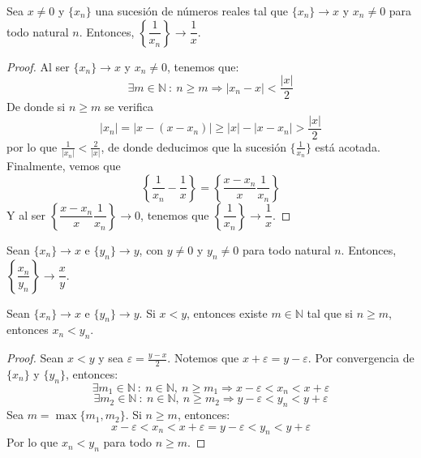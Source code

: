 \begin{prop}
    Sea $x \neq 0$ y $\{x_n\}$ una sucesión de números reales tal que $\{x_n\} \longrightarrow x$ y $x_n \neq 0$ para todo natural $n$. Entonces, $\left\{\dfrac{1}{x_n}\right\} \longrightarrow \dfrac{1}{x}$.
\end{prop}
\begin{proof}
    Al ser $\{x_n\} \longrightarrow x$ y $x_n \neq 0$, tenemos que:
    \begin{equation*}
        \exists m \in \mathbb{N} ~:~ n \geq m \Longrightarrow |x_n-x| < \frac{|x|}{2}
    \end{equation*}
    De donde si $n \geq m$ se verifica
    \begin{equation*}
        |x_n| = |x-(x-x_n)| \geq |x| - |x - x_n| > \frac{|x|}{2}
    \end{equation*}
    por lo que $\frac{1}{|x_n|} < \frac{2}{|x|}$, de donde deducimos que la sucesión $\{\frac{1}{x_n}\}$ está acotada.
    Finalmente, vemos que
    \begin{equation*}
        \left\{\frac{1}{x_n} - \frac{1}{x}\right\}=\left\{\frac{x-x_n}{x} \frac{1}{x_n}\right\}
    \end{equation*}
    Y al ser $\left\{\dfrac{x-x_n}{x} \dfrac{1}{x_n}\right\} \longrightarrow 0$, tenemos que $\left\{\dfrac{1}{x_n}\right\} \longrightarrow \dfrac{1}{x}$.
\end{proof}

\begin{coro}
    Sean $\{x_n\} \longrightarrow x$ e $\{y_n\} \longrightarrow y$, con $y \neq 0$ y $y_n \neq 0$ para todo natural $n$. Entonces, $\left\{\dfrac{x_n}{y_n}\right\} \longrightarrow \dfrac{x}{y}$.
\end{coro}

\begin{prop}
    Sean $\{x_n\} \longrightarrow x$ e $\{y_n\} \longrightarrow y$. Si $x < y$, entonces existe $m \in \mathbb{N}$ tal que si $n \geq m$, entonces $x_n < y_n$.
\end{prop}
\begin{proof}
    Sean $x < y$ y sea $\varepsilon = \frac{y-x}{2}$. Notemos que $x+\varepsilon = y-\varepsilon$.
    Por convergencia de $\{x_n\}$ y $\{y_n\}$, entonces:
    \begin{equation*}
        \exists m_1 \in \mathbb{N} ~:~ n \in \mathbb{N}, ~n \geq m_1 \Longrightarrow x-\varepsilon < x_n < x+\varepsilon
    \end{equation*}
    \begin{equation*}
        \exists m_2 \in \mathbb{N} ~:~ n \in \mathbb{N}, ~n \geq m_2 \Longrightarrow y-\varepsilon < y_n < y+\varepsilon
    \end{equation*}
    Sea $m = \max \{m_1, m_2\}$. Si $n \geq m$, entonces:
    \begin{equation*}
        x-\varepsilon < x_n < x+\varepsilon = y-\varepsilon < y_n < y+\varepsilon
    \end{equation*}
    Por lo que $x_n < y_n$ para todo $n \geq m$.
\end{proof}


